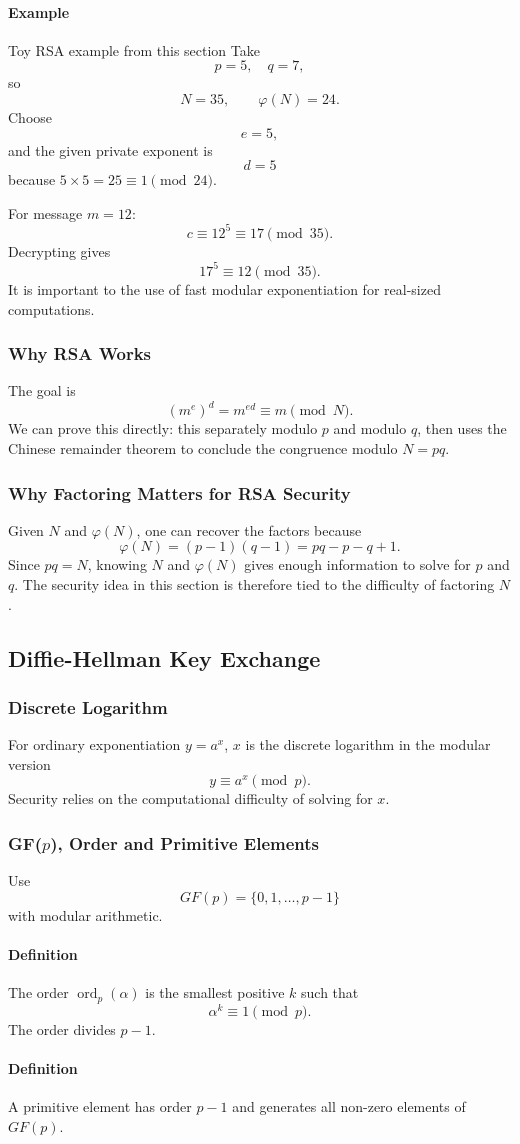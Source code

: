 \documentclass[12pt]{article}
\newcommand{\Definition}{\paragraph{Definition}}
\newcommand{\Example}{\paragraph{Example}}
\begin{document}
\Example{Toy RSA example from this section}
Take
\[
p=5,\quad q=7,
\]
so
\[
N=35,\qquad\varphi(N)=24.
\]
Choose
\[
e=5,
\]
and the given private exponent is
\[
d=5
\]
because $5\times5=25\equiv1\pmod{24}$.

For message $m=12$:
\[
c\equiv12^5\equiv17\pmod{35}.
\]
Decrypting gives
\[
17^5\equiv12\pmod{35}.
\]
It is important to the use of fast modular exponentiation for real-sized computations.

\subsubsection{Why RSA Works}
The goal is
\[
(m^e)^d=m^{ed}\equiv m\pmod N.
\]
We can prove this directly: this separately modulo $p$ and modulo $q$, then uses the Chinese remainder theorem to conclude the congruence modulo $N=pq$.

\subsubsection{Why Factoring Matters for RSA Security}
Given $N$ and $\varphi(N)$, one can recover the factors because
\[
\varphi(N)=(p-1)(q-1)=pq-p-q+1.
\]
Since $pq=N$, knowing $N$ and $\varphi(N)$ gives enough information to solve for $p$ and $q$. The security idea in this section is therefore tied to the difficulty of factoring $N$.

\subsection{Diffie-Hellman Key Exchange}
\subsubsection{Discrete Logarithm}
For ordinary exponentiation $y=a^x$, $x$ is the discrete logarithm in the modular version
\[
y\equiv a^x\pmod p.
\]
Security relies on the computational difficulty of solving for $x$.

\subsubsection{GF($p$), Order and Primitive Elements}
Use
\[
GF(p)=\{0,1,\ldots,p-1\}
\]
with modular arithmetic.

\Definition The order $\operatorname{ord}_p(\alpha)$ is the smallest positive $k$ such that
\[
\alpha^k\equiv1\pmod p.
\]
The order divides $p-1$.

\Definition A primitive element has order $p-1$ and generates all non-zero elements of $GF(p)$.
\end{document}
